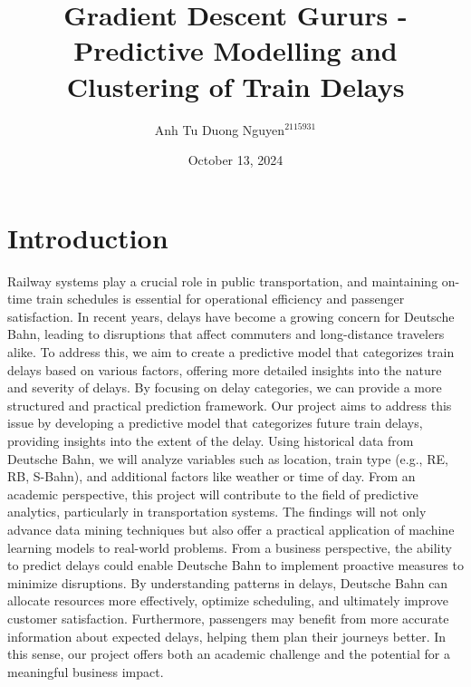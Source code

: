 \documentclass[a4paper,oneside,bibliography=totoc]{scrbook}
\begin{document}
\frontmatter \subject{Data Mining Project Outline HWS24} %
\title{Gradient Descent Gururs - Predictive Modelling and Clustering of Train Delays}
\author{Anh Tu Duong Nguyen$^{2115931}$} \date{October 13, 2024}
\publishers{{\small Submitted to}\\
Data and Web Science Group\\
Prof.\ Dr.\ Hertling\\
University of Mannheim\\}

\maketitle

\mainmatter
\chapter{Introduction}
\label{ch:intro}
Railway systems play a crucial role in public transportation, and maintaining on-time train schedules is essential for operational efficiency and passenger satisfaction. In recent years, delays have become a growing concern for Deutsche Bahn, leading to disruptions that affect commuters and long-distance travelers alike. To address this, we aim to create a predictive model that categorizes train delays based on various factors, offering more detailed insights into the nature and severity of delays. By focusing on delay categories, we can provide a more structured and practical prediction framework.
Our project aims to address this issue by developing a predictive model that categorizes future train delays, providing insights into the extent of the delay. Using historical data from Deutsche Bahn, we will analyze variables such as location, train type (e.g., RE, RB, S-Bahn), and additional factors like weather or time of day. From an academic perspective, this project will contribute to the field of predictive analytics, particularly in transportation systems. The findings will not only advance data mining techniques but also offer a practical application of machine learning models to real-world problems.
From a business perspective, the ability to predict delays could enable Deutsche Bahn to implement proactive measures to minimize disruptions. By understanding patterns in delays, Deutsche Bahn can allocate resources more effectively, optimize scheduling, and ultimately improve customer satisfaction. Furthermore, passengers may benefit from more accurate information about expected delays, helping them plan their journeys better. In this sense, our project offers both an academic challenge and the potential for a meaningful business impact.
\end{document}

